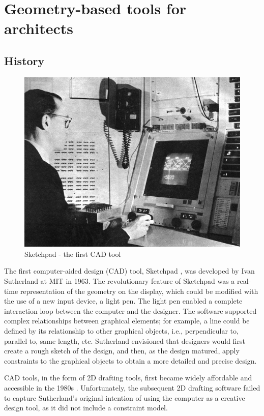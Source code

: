 \section{Geometry-based tools for architects}
\subsection{History}
\begin{figure}
  \includegraphics[width=350pt]{graphics/sketchpad.jpg}
  \caption{Sketchpad - the first CAD tool}
  \label{fig:sketchpad}
\end{figure}
The first computer-aided design (CAD) tool, Sketchpad \cite{Aish2005}, was developed by Ivan Sutherland at MIT in 1963. The revolutionary feature of Sketchpad was a real-time representation of the geometry on the display, which could be modified with the use of a new input device, a light pen. The light pen enabled a complete interaction loop between the computer and the designer. The software supported complex relationships between graphical elements; for example, a line could be defined by its relationship to other graphical objects, i.e., perpendicular to, parallel to, same length, etc. Sutherland envisioned that designers would first create a rough sketch of the design, and then, as the design matured, apply constraints to the graphical objects to obtain a more detailed and precise design. 

CAD tools, in the form of 2D drafting tools, first became widely affordable and accessible in the 1980s \cite{Aish2005}. Unfortunately, the subsequent 2D drafting software failed to capture Sutherland’s original intention of using the computer as a creative design tool, as it did not include a constraint model. 

